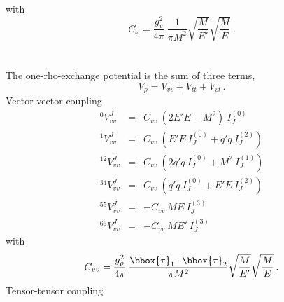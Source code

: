 with
\begin{equation}
C_{\omega}= \frac{g^2_{v}}{4\pi}\: \frac{1}{\pi M^2}
\sqrt{\frac{M}{E'}}
\sqrt{\frac{M}{E}}
\: .
\label{32.13a}
\end{equation}
\\ \\
The one-rho-exchange potential is the sum of three
terms,
\begin{equation}
V_\rho = V_{vv} + V_{tt} + V_{vt}
\, .
\end{equation}
Vector-vector coupling
\begin{eqnarray}
^0V^J_{vv} & = &
C_{vv}\: (2E'E-M^2)\: I^{(0)}_J 
\nonumber \\
^1V^J_{vv} & = &
C_{vv}\: ( E'E\: I^{(0)}_J + q'q\: I^{(2)}_J )
\nonumber \\
^{12}V^J_{vv} & = &
C_{vv}\: ( 2q'q\: I^{(0)}_J + M^2\: I^{(1)}_J )
\label{32.12a} \\
^{34}V^J_{vv} & = &
C_{vv}\: ( q'q\: I^{(0)}_J + E'E\: I^{(2)}_J )
\nonumber \\
^{55}V^J_{vv} & = &
-C_{vv}\:  ME\: I^{(3)}_J
\nonumber \\
^{66}V^J_{vv} & = &
-C_{vv}\:  ME'\: I^{(3)}_J
\nonumber
\end{eqnarray}
with
\begin{equation}
C_{vv}= \frac{g^2_{\rho}}{4\pi}\: 
\frac{
\bbox{\tau}_1 \cdot \bbox{\tau}_2
}{\pi M^2}
\sqrt{\frac{M}{E'}}
\sqrt{\frac{M}{E}}
\: .
\label{32.13}
\end{equation}
Tensor-tensor coupling

